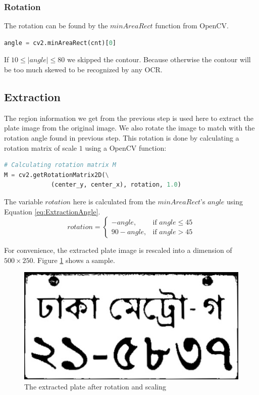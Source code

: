 \documentclass{standalone}
\begin{document}
\subsubsection{Rotation}
The rotation can be found by the $minAreaRect$ function from OpenCV. 
\begin{lstlisting}[language=Python]
angle = cv2.minAreaRect(cnt)[0]
\end{lstlisting}
If $10 \leq |angle| \leq 80$ we skipped the contour. Because otherwise the contour will be too much skewed to be recognized by any OCR.

\subsection{Extraction}
The region information we get from the previous step is used here to extract the plate image from the original image. We also rotate the image to match with the rotation angle found in previous step. This rotation is done by calculating a rotation matrix of scale $1$ using a OpenCV function:
\begin{lstlisting}[language=Python]
# Calculating rotation matrix M
M = cv2.getRotationMatrix2D(\
		     (center_y, center_x), rotation, 1.0)
\end{lstlisting}

The variable $rotation$ here is calculated from the $minAreaRect$'s $angle$ using Equation \ref{eq:ExtractionAngle}.
\begin{equation} \label{eq:ExtractionAngle}
rotation = 
\begin{cases} 
	-angle, & \mbox{if } angle \leq 45\\
    90 - angle, & \mbox{if } angle > 45
\end{cases}
\end{equation}

For convenience, the extracted plate image is rescaled into a dimension of $500 \times 250$. Figure \ref{fig:FinalPlate} shows a sample.
\begin{figure}
    \centering
    \includegraphics[width=.7\linewidth]{./img/sample/stage10.jpg}
    \caption{The extracted plate after rotation and scaling}
    \label{fig:FinalPlate}
\end{figure}
\end{document}
